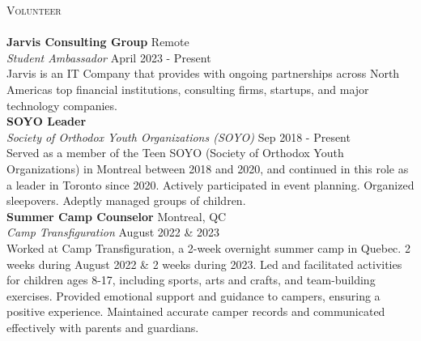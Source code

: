 \documentclass[a4paper]{article}
\newcommand{\lineunder} {
	\vspace*{-8pt} \\
	\hspace*{-18pt} \hrulefill \\
}
\newcommand{\header} [1] {
	{\hspace*{-18pt}\vspace*{6pt} \textsc{#1}}
	\vspace*{-6pt} \lineunder
}
\begin{document}
	\header{Volunteer}
	\textbf{Jarvis Consulting Group} \hfill Remote\\
	\textit{Student Ambassador} \hfill April 2023 - Present\\
	Jarvis is an IT Company that provides with ongoing partnerships across North America\textquotesingle{}s top financial institutions, consulting firms, startups, and major technology companies. \\
	\vspace*{2mm}
	\textbf{SOYO Leader} \hfill\\
	\textit{Society of Orthodox Youth Organizations (SOYO)} \hfill Sep 2018 - Present\\
	Served as a member of the Teen SOYO (Society of Orthodox Youth Organizations) in Montreal between 2018 and 2020, and continued in this role as a leader in Toronto since 2020. Actively participated in event planning. Organized sleepovers. Adeptly managed groups of children. \\
	\vspace*{2mm}
	\textbf{Summer Camp Counselor} \hfill Montreal, QC\\
	\textit{Camp Transfiguration} \hfill August 2022 \& 2023\\
	Worked at Camp Transfiguration, a 2-week overnight summer camp in Quebec. 2 weeks during August 2022 \& 2 weeks during 2023. Led and facilitated activities for children ages 8-17, including sports, arts and crafts, and team-building exercises. Provided emotional support and guidance to campers, ensuring a positive experience. Maintained accurate camper records and communicated effectively with parents and guardians.\\
	
	
\end{document}
